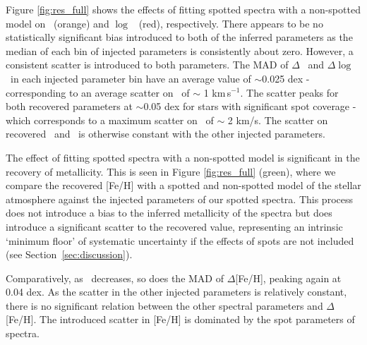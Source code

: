 Figure \ref{fig:res_full} shows the effects of fitting spotted spectra with a non-spotted model on \logg\ (orange) and $\log$ \vsini\ (red), respectively.
There appears to be no statistically significant bias introduced to both of the inferred parameters as the median of each bin of injected parameters is consistently about zero. However, a consistent scatter is introduced to both parameters. The MAD of $\Delta$ \logg\ and $\Delta \log$ \vsini\ in each injected parameter bin have an average value of $\sim$0.025 dex - corresponding to an average scatter on \vsini\ of $\sim$ 1 km\,s$^{-1}$. The scatter peaks for both recovered parameters at $\sim$0.05 dex for stars with significant spot coverage - which corresponds to a maximum scatter on \vsini\ of $\sim$ 2 km/s. The scatter on recovered \vsini\ and \logg\ is otherwise constant with the other injected parameters.

The effect of fitting spotted spectra with a non-spotted model is significant in the recovery of metallicity. This is seen in Figure \ref{fig:res_full} (green), where we compare the recovered [Fe/H] with a spotted and non-spotted model of the stellar atmosphere against the injected parameters of our spotted spectra. This process does not introduce a bias to the inferred metallicity of the spectra but does introduce a significant scatter to the recovered value, representing an intrinsic `minimum floor' of systematic uncertainty if the effects of spots are not included (see Section~\ref{sec:discussion}).

 Comparatively, as \xspot\ decreases, so does the MAD of $\Delta$[Fe/H], peaking again at 0.04 dex. As the scatter in the other injected parameters is relatively constant, there is no significant relation between the other spectral parameters and $\Delta$[Fe/H]. The introduced scatter in [Fe/H] is dominated by the spot parameters of spectra.


